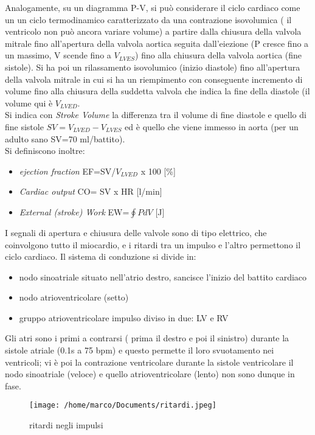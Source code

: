 \documentclass[10pt]{article}
\begin{document}
Analogamente, su un diagramma P-V, si può considerare il ciclo cardiaco come un un ciclo termodinamico caratterizzato da una contrazione isovolumica ( il ventricolo non può ancora variare volume) a partire dalla chiusura della valvola mitrale fino all'apertura della valvola aortica seguita dall'eiezione (P cresce fino a un massimo, V scende fino a $V_{LVES}$) fino alla chiusura della valvola aortica (fine sistole). Si ha poi un rilassamento isovolumico (inizio diastole) fino all'apertura della valvola mitrale in cui si ha un riempimento con conseguente incremento di volume fino alla chiusura della suddetta valvola che indica la fine della diastole (il volume qui è $V_{LVED}$.\\
Si indica con \textit{Stroke Volume} la differenza tra il volume di fine diastole e quello di fine sistole \textrightarrow $SV=V_{LVED}-V_{LVES}$ ed è quello che viene immesso in aorta (per un adulto sano SV=70 ml/battito).\\
Si definiscono inoltre:
\begin{itemize}
    \item \textit{ejection fraction} EF=SV/$V_{LVED}$ x 100 [\%]
    \item \textit{Cardiac output} CO= SV x HR [l/min]
    \item \textit{External (stroke) Work} EW=$\oint PdV$ [J]
\end{itemize}

I segnali di apertura e chiusura delle valvole sono di tipo elettrico, che coinvolgono tutto il miocardio, e i ritardi tra un impulso e l'altro permettono il ciclo cardiaco.
Il sistema di conduzione si divide in:
\begin{itemize}
    \item nodo sinoatriale \textrightarrow situato nell'atrio destro, sancisce l'inizio del battito cardiaco
    \item nodo atrioventricolare (setto)
    \item gruppo atrioventricolare \textrightarrow impulso diviso in due: LV e RV
\end{itemize}

Gli atri sono i primi a contrarsi ( prima il destro e poi il sinistro) durante la sistole atriale (0.1s a 75 bpm) e questo permette il loro svuotamento nei ventricoli; vi è poi la contrazione ventricolare durante la sistole ventricolare \textrightarrow il nodo sinoatriale (veloce) e quello atrioventricolare (lento) non sono dunque in fase.

\begin{figure}[h!]
\centering
\texttt{[image: /home/marco/Documents/ritardi.jpeg]}
\caption{ritardi negli impulsi}
\label{fig:cuore}
\end{figure}
\end{document}
